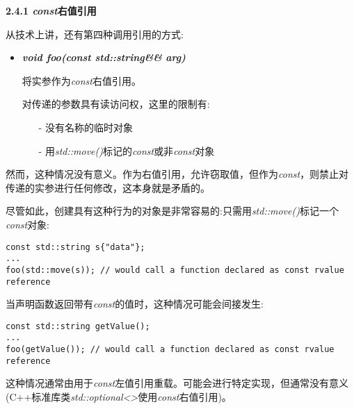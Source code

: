 \hspace*{\fill} \par %
\textbf{2.4.1 \textit{const}右值引用}

从技术上讲，还有第四种调用引用的方式:\par

\begin{itemize}
	\item \textit{\textbf{void foo(const std::string\&\& arg)}}\par
	将实参作为\textit{const}右值引用。\par
	对传递的参数具有读访问权，这里的限制有:
	\begin{itemize}
		\item[-] 没有名称的临时对象
		\item[-] 用\textit{std::move()}标记的\textit{const}或非\textit{const}对象
	\end{itemize}
\end{itemize}

然而，这种情况没有意义。作为右值引用，允许窃取值，但作为\textit{const}，则禁止对传递的实参进行任何修改，这本身就是矛盾的。\par

尽管如此，创建具有这种行为的对象是非常容易的:只需用\textit{std::move()}标记一个\textit{const}对象:\par

\begin{lstlisting}[caption={}]
const std::string s{"data"};
...
foo(std::move(s)); // would call a function declared as const rvalue reference
\end{lstlisting}

当声明函数返回带有\textit{const}的值时，这种情况可能会间接发生:\par

\begin{lstlisting}[caption={}]
const std::string getValue();
...
foo(getValue()); // would call a function declared as const rvalue reference
\end{lstlisting}

这种情况通常由用于\textit{const}左值引用重载。可能会进行特定实现，但通常没有意义(C++标准库类\textit{std::optional<>}使用\textit{const}右值引用)。\par




















































